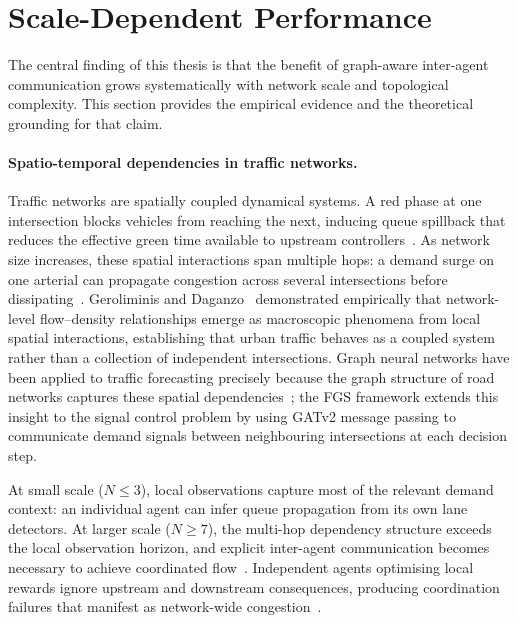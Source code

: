 \section{Scale-Dependent Performance}
\label{sec:ResultsAndDiscussion_ScaleDependency}

The central finding of this thesis is that the benefit of graph-aware inter-agent communication grows systematically with network scale and topological complexity. This section provides the empirical evidence and the theoretical grounding for that claim.

\paragraph{Spatio-temporal dependencies in traffic networks.}
Traffic networks are spatially coupled dynamical systems. A red phase at one intersection blocks vehicles from reaching the next, inducing queue spillback that reduces the effective green time available to upstream controllers~\citep{daganzo1994cell}. As network size increases, these spatial interactions span multiple hops: a demand surge on one arterial can propagate congestion across several intersections before dissipating~\citep{chen2020toward}. Geroliminis and Daganzo~\citep{geroliminis2008existence} demonstrated empirically that network-level flow--density relationships emerge as macroscopic phenomena from local spatial interactions, establishing that urban traffic behaves as a coupled system rather than a collection of independent intersections. Graph neural networks have been applied to traffic forecasting precisely because the graph structure of road networks captures these spatial dependencies~\citep{yu2018spatio}; the FGS framework extends this insight to the signal control problem by using GATv2 message passing to communicate demand signals between neighbouring intersections at each decision step.

At small scale ($N \leq 3$), local observations capture most of the relevant demand context: an individual agent can infer queue propagation from its own lane detectors. At larger scale ($N \geq 7$), the multi-hop dependency structure exceeds the local observation horizon, and explicit inter-agent communication becomes necessary to achieve coordinated flow~\citep{chen2020toward,wei2019colight}. Independent agents optimising local rewards ignore upstream and downstream consequences, producing coordination failures that manifest as network-wide congestion~\citep{ault2021reinforcement}.


